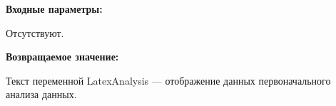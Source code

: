\textbf{Входные параметры:}

Отсутствуют.

\textbf{Возвращаемое значение:}

Текст переменной LatexAnalysis --- отображение данных первоначального анализа данных.